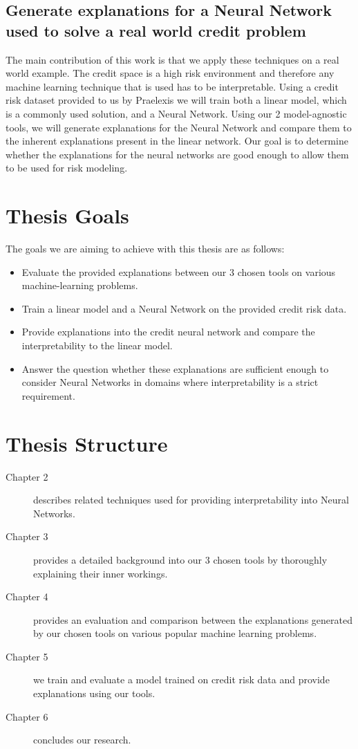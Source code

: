 \subsection{Generate explanations for a Neural Network used to solve a real world credit problem}
The main contribution of this work is that we apply these techniques on a real world example. The credit space is a high risk environment and therefore any machine learning technique that is used has to be interpretable. Using a credit risk dataset provided to us by Praelexis we will train both a linear model, which is a commonly used solution, and a Neural Network. Using our 2 model-agnostic tools, we will generate explanations for the Neural Network and compare them to the inherent explanations present in the linear network. Our goal is to determine whether the explanations for the neural networks are good enough to allow them to be used for risk modeling.

\section{Thesis Goals}
The goals we are aiming to achieve with this thesis are as follows:
\begin{itemize}
    \item Evaluate the provided explanations between our 3 chosen tools on various machine-learning problems.
    \item Train a linear model and a Neural Network on the provided credit risk data.
    \item Provide explanations into the credit neural network and compare the interpretability to the linear model.
    \item Answer the question whether these explanations are sufficient enough to consider Neural Networks in domains where interpretability is a strict requirement.
\end{itemize}
\section{Thesis Structure}
\begin{description}
 \item[Chapter 2] describes related techniques used for providing interpretability into Neural Networks.
 \item[Chapter 3] provides a detailed background into our 3 chosen tools by thoroughly explaining their inner workings.
 \item[Chapter 4] provides an evaluation and comparison between the explanations generated by our chosen tools on various popular machine learning problems.
 \item[Chapter 5] we train and evaluate a model trained on credit risk data and provide explanations using our tools.
 \item[Chapter 6] concludes our research.
\end{description}